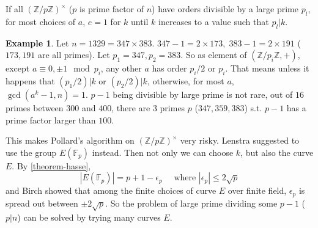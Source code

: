 \documentclass[12pt]{article}
\theoremstyle{remark}
\theoremstyle{definition}
\newtheorem{example}{Example}[subsection]
\newcommand{\Z}[0]{\mathbb{Z}}
\newcommand{\F}[0]{\mathbb{F}}
\begin{document}
        If all $(\Z/p\Z)^\times$ ($p$ is prime factor of $n$) have orders divisible by a large prime $p_l$, for most choices of $a$, $e = 1$ for $k$ until $k$ increases to a value such that $p_l | k$.
        \begin{example}
            Let $n = 1329 = 347 \times 383$. $347 - 1 = 2 \times 173, \; 383 - 1 = 2 \times 191$ ($173, 191$ are all primes). Let $p_1 = 347, p_2 = 383$. So as element of $(\Z/p_i\Z, +)$, except $a \equiv 0, \pm 1 \mod p_i$, any other $a$ has order $p_i/2$ or $p_i$. That means unless it happens that $(p_1/2) | k$ or $(p_2/2) | k$, otherwise, for most $a$, $\gcd(a^k-1, n) = 1$. $p-1$ being divisible by large prime is not rare, out of $16$ primes between $300$ and $400$, there are $3$ primes $p$ ($347, 359, 383$) s.t. $p-1$ has a prime factor larger than $100$. 
        \end{example}
        This makes Pollard's algorithm on $(\Z/p\Z)^\times$ very risky. Lenstra suggested to use the group $E(\F_p)$ instead. Then not only we can choose $k$, but also the curve $E$. By \autoref{theorem-hasse}, 
        $$|E(\F_p)| = p+1 - \epsilon_p \quad \text{ where }|\epsilon_p| \leq 2 \sqrt{p}$$
        and Birch \cite{birch} showed that among the finite choices of curve $E$ over finite field, $\epsilon_p$ is spread out between $\pm 2 \sqrt{p}$. So the problem of large prime dividing some $p-1$ ($p | n$) can be solved by trying many curves $E$.
        
\end{document}
